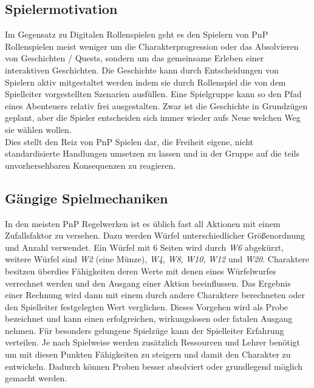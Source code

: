 \subsection{Spielermotivation}
\label{sec:Spielermotivation}

Im Gegensatz zu Digitalen Rollenspielen geht es den Spielern von PnP Rollenspielen meist weniger um die Charakterprogression oder das Absolvieren von Geschichten / Quests, sondern um das gemeinsame Erleben einer interaktiven Geschichten. Die Geschichte kann durch Entscheidungen von Spielern aktiv mitgestaltet werden indem sie durch Rollenspiel die von dem Spielleiter vorgestellten Szenarien ausfüllen. Eine Spielgruppe kann so den Pfad eines Abenteuers relativ frei ausgestalten. Zwar ist die Geschichte in Grundzügen geplant, aber die Spieler entscheiden sich immer wieder aufs Neue welchen Weg sie wählen wollen. \cite{Arinbjarnar}\\
Dies stellt den Reiz von PnP Spielen dar, die Freiheit eigene, nicht standardisierte Handlungen umsetzen zu lassen und in der Gruppe auf die teils unvorhersehbaren Konsequenzen zu reagieren.


\subsection{Gängige Spielmechaniken}
\label{sec:Spielmechaniken}

In den meisten PnP Regelwerken ist es üblich fast all Aktionen mit einem Zufallsfaktor zu versehen. Dazu werden Würfel unterschiedlicher Größenordnung und Anzahl verwendet. Ein Würfel mit 6 Seiten wird durch \textit{W6} abgekürzt, weitere Würfel sind \textit{W2} (eine Münze), \textit{W4}, \textit{W8}, \textit{W10}, \textit{W12} und \textit{W20}.\newline
Charaktere besitzen überdies Fähigkeiten deren Werte mit denen eines Würfelwurfes verrechnet werden und den Ausgang einer Aktion beeinflussen. Das Ergebnis einer Rechnung wird dann mit einem durch andere Charaktere berechneten oder den Spielleiter festgelegten Wert verglichen. Dieses Vorgehen wird als Probe bezeichnet und kann einen erfolgreichen, wirkungslosen oder fatalen Ausgang nehmen.\newline
Für besonders gelungene Spielzüge kann der Spielleiter Erfahrung verteilen. Je nach Spielweise werden zusätzlich Ressourcen und Lehrer benötigt um mit diesen Punkten Fähigkeiten zu steigern und damit den Charakter zu entwickeln. Dadurch können Proben besser absolviert oder grundlegend möglich gemacht werden.




